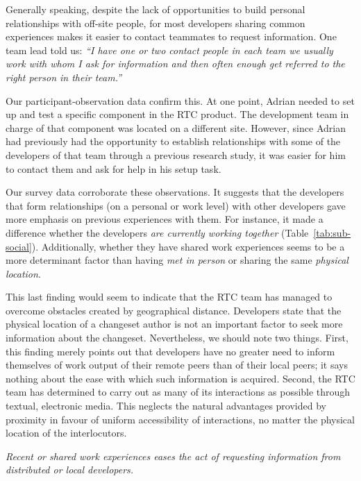 \documentclass{sig-alternate}
\newenvironment{note}%
{\medskip
\noindent
\vspace{2pt}
\let\emph=\textbf
\begin{boxedminipage}{.99\columnwidth}\em}%
{\end{boxedminipage}}
\begin{document}
Generally speaking, despite the lack of opportunities to build personal relationships with off-site people, for most developers sharing common experiences makes it easier to contact teammates to request information. One team lead told us: \emph{``I have one or two contact people in each team we usually work with whom I ask for information and then often enough get referred to the right person in their team.''}

Our participant-observation data confirm this. At one point, Adrian needed to set up and test a specific component in the RTC product. The development team in charge of that component was located on a different site. However, since Adrian had previously had the opportunity to establish relationships with some of the developers of that team through a previous research study, it was easier for him to contact them and ask for help in his setup task.

Our survey data corroborate these observations. It suggests that the developers that form relationships (on a personal or work level) with other developers gave more emphasis on previous experiences with them. For instance, it made a difference whether the developers \emph{are currently working together} (Table~\ref{tab:sub-social}). Additionally, whether they have shared work experiences seems to be a more determinant factor than having \emph{met in person} or sharing the same \emph{physical location}.

This last finding would seem to indicate that the RTC team has managed to overcome obstacles created by geographical distance. Developers state that the physical location of a changeset author is not an important factor to seek more information about the changeset. Nevertheless, we should note two things. First, this finding merely points out that developers have no greater need to inform themselves of work output of their remote peers than of their local peers; it says nothing about the ease with which such information is acquired. Second, the RTC team has determined to carry out as many of its interactions as possible through textual, electronic media. This neglects the natural advantages provided by proximity in favour of uniform accessibility of interactions, no matter the physical location of the interlocutors.

\begin{note}
Recent or shared work experiences eases the act of requesting information from distributed or local developers.
\end{note}
\end{document}
